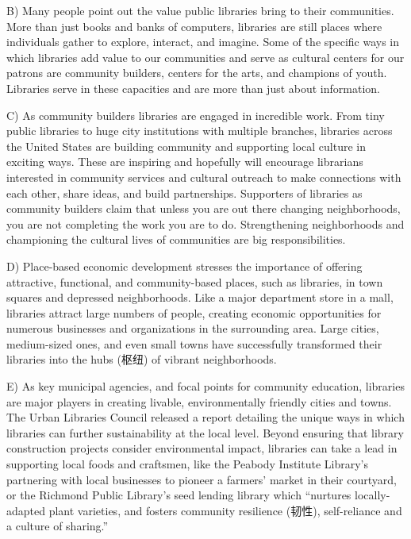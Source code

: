\documentclass[UTF8,11pt]{ctexart}
\begin{document}
B) Many people point out the value public libraries bring to their communities. More than just books and banks of computers, libraries are still places where individuals gather to explore, interact, and imagine. Some of the specific ways in which libraries add value to our communities and serve as cultural centers for our patrons are community builders, centers for the arts, and champions of youth. Libraries serve in these capacities and are more than just about information.


C) As community builders libraries are engaged in incredible work. From tiny public libraries to huge city institutions with multiple branches, libraries across the United States are building community and supporting local culture in exciting ways. These are inspiring and hopefully will encourage librarians interested in community services and cultural outreach to make connections with each other, share ideas, and build partnerships. Supporters of libraries as community builders claim that unless you are out there changing neighborhoods, you are not completing the work you are to do. Strengthening neighborhoods and championing the cultural lives of communities are big responsibilities.


D) Place-based economic development stresses the importance of offering attractive, functional, and community-based places, such as libraries, in town squares and depressed neighborhoods. Like a major department store in a mall, libraries attract large numbers of people, creating economic opportunities for numerous businesses and organizations in the surrounding area. Large cities, medium-sized ones, and even small towns have successfully transformed their libraries into the hubs (枢纽) of vibrant neighborhoods.


E) As key municipal agencies, and focal points for community education, libraries are major players in creating livable, environmentally friendly cities and towns. The Urban Libraries Council released a report detailing the unique ways in which libraries can further sustainability at the local level. Beyond ensuring that library construction projects consider environmental impact, libraries can take a lead in supporting local foods and craftsmen, like the Peabody Institute Library’s partnering with local businesses to pioneer a farmers’ market in their courtyard, or the Richmond Public Library’s seed lending library which “nurtures locally-adapted plant varieties, and fosters community resilience (韧性), self-reliance and a culture of sharing.”
\end{document}
